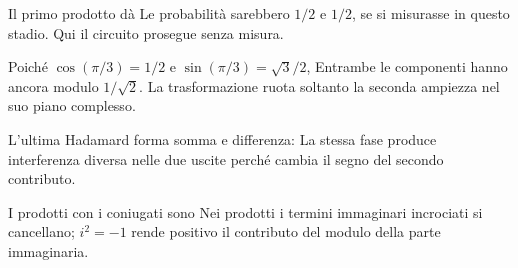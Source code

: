 \ExSolution


Il primo prodotto dà
Le probabilità sarebbero \(1/2\) e \(1/2\), se si misurasse in questo stadio. Qui il circuito prosegue senza misura.


Poiché \(\cos(\pi/3)=1/2\) e \(\sin(\pi/3)=\sqrt3/2\),
Entrambe le componenti hanno ancora modulo \(1/\sqrt2\). La trasformazione ruota soltanto la seconda ampiezza nel suo piano complesso.


L’ultima Hadamard forma somma e differenza:
La stessa fase produce interferenza diversa nelle due uscite perché cambia il segno del secondo contributo.


I prodotti con i coniugati sono
Nei prodotti i termini immaginari incrociati si cancellano; \(i^2=-1\) rende positivo il contributo del modulo della parte immaginaria.

